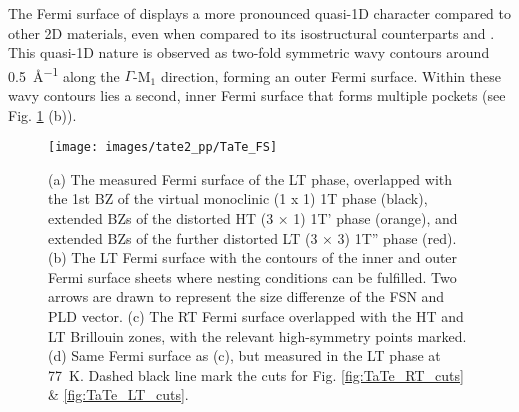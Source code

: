 The Fermi surface of  displays a more pronounced quasi-1D character compared to other 2D materials, even when compared to its isostructural counterparts  and  \cite{lin_evidence_2022}.
This quasi-1D nature is observed as two-fold symmetric wavy contours around \qty{0.5}{\angstrom^{-1}} along the $\Gamma$-M$_1$ direction, forming an outer Fermi surface.
Within these wavy contours lies a second, inner Fermi surface that forms multiple pockets (see Fig. \ref{fig:TaTe_FS} (b)).

\begin{figure}[t!]
	\centering
	\texttt{[image: images/tate2\_pp/TaTe\_FS]}
	\caption{(a) The measured Fermi surface of the LT phase, overlapped with the 1st BZ of the virtual monoclinic (1 x 1) 1T phase (black), extended BZs of the distorted HT (3 × 1) 1T' phase (orange), and extended BZs of the further distorted LT (3 × 3) 1T'' phase (red). (b) The LT Fermi surface with the contours of the inner and outer Fermi surface sheets where nesting conditions can be fulfilled. Two arrows are drawn to represent the size differenze of the FSN and PLD vector. (c) The RT Fermi surface overlapped with the HT and LT Brillouin zones, with the relevant high-symmetry points marked. (d) Same Fermi surface as (c), but measured in the LT phase at \qty{77}{\kelvin}. Dashed black line mark the cuts for Fig. \ref{fig:TaTe_RT_cuts} \& \ref{fig:TaTe_LT_cuts}.}
	\label{fig:TaTe_FS}
\end{figure}


